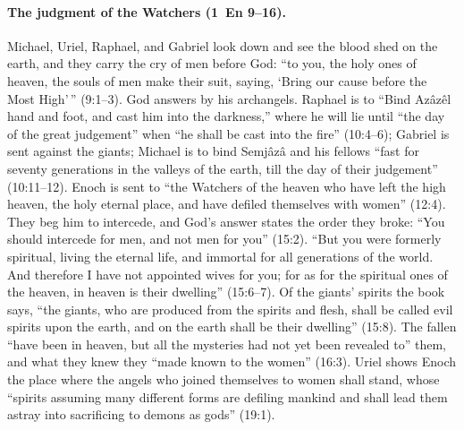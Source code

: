 \paragraph{The judgment of the Watchers (1~En 9--16).} Michael, Uriel,
Raphael, and Gabriel look down and see the blood shed on the earth, and
they carry the cry of men before God: ``to you, the holy ones of heaven, the
souls of men make their suit, saying, `Bring our cause before the Most
High'\,'' (9:1--3). God answers by his archangels. Raphael is to ``Bind
Azâzêl hand and foot, and cast him into the darkness,'' where he will lie
until ``the day of the great judgement'' when ``he shall be cast into the
fire'' (10:4--6); Gabriel is sent against the giants; Michael is to bind
Semjâzâ and his fellows ``fast for seventy generations in the valleys of the
earth, till the day of their judgement'' (10:11--12). Enoch is sent to ``the
Watchers of the heaven who have left the high heaven, the holy eternal
place, and have defiled themselves with women'' (12:4). They beg him to
intercede, and God's answer states the order they broke: ``You should
intercede for men, and not men for you'' (15:2). ``But you were formerly
spiritual, living the eternal life, and immortal for all generations of the
world. And therefore I have not appointed wives for you; for as for the
spiritual ones of the heaven, in heaven is their dwelling'' (15:6--7). Of
the giants' spirits the book says, ``the giants, who are produced from the
spirits and flesh, shall be called evil spirits upon the earth, and on the
earth shall be their dwelling'' (15:8). The fallen ``have been in heaven,
but all the mysteries had not yet been revealed to'' them, and what they
knew they ``made known to the women'' (16:3). Uriel shows Enoch the place
where the angels who joined themselves to women shall stand, whose ``spirits
assuming many different forms are defiling mankind and shall lead them
astray into sacrificing to demons as gods'' (19:1).

